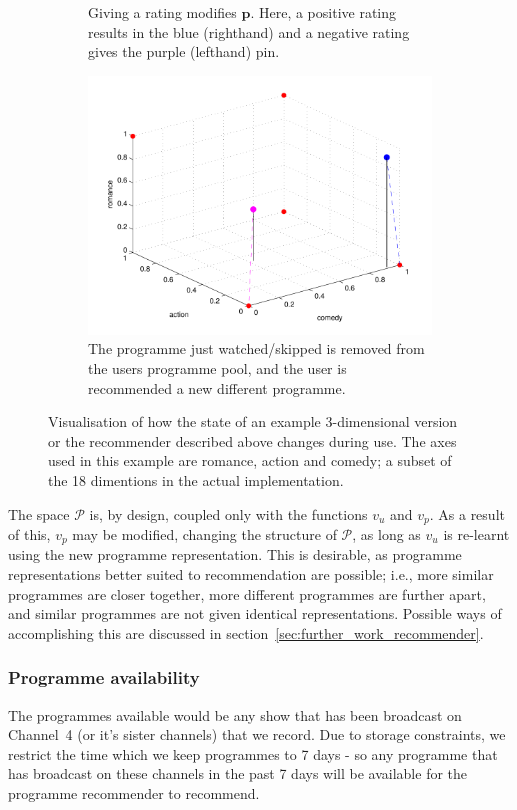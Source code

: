 \begin{figure}[h!]
\begin{center}
\begin{subfigure}[t]{0.32\textwidth}
					\caption{Giving a rating modifies $\mathbf{p}$. Here, a positive rating results in the blue (righthand) and a negative rating gives the purple (lefthand) pin.}
				\end{subfigure}
				\begin{subfigure}[t]{0.32\textwidth}
					\includegraphics[width=\textwidth]{images/recommender_3.pdf}
					\caption{The programme just watched/skipped is removed from the users programme pool, and the user is recommended a new different programme.}
				\end{subfigure}
				\caption{Visualisation of how the state of an example 3-dimensional version or the recommender described above changes during use. The axes used in this example are romance, action and comedy; a subset of the 18 dimentions in the actual implementation.}
				\label{fig:recommender_example}
			\end{center}
		\end{figure}

		The space $\mathcal{P}$ is, by design, coupled only with the functions $v_u$ and $v_p$. As a result of this, $v_p$ may be modified, changing the structure of $\mathcal{P}$, as long as $v_u$ is re-learnt using the new programme representation. This is desirable, as programme representations better suited to recommendation are possible; i.e., more similar programmes are closer together, more different programmes are further apart, and similar programmes are not given identical representations. Possible ways of accomplishing this are discussed in section~\ref{sec:further_work_recommender}.

	\subsubsection{Programme availability}

		The programmes available would be any show that has been broadcast on Channel~4 (or it's sister channels) that we record. Due to storage constraints, we restrict the time which we keep programmes to 7 days - so any programme that has broadcast on these channels in the past 7 days will be available for the programme recommender to recommend.
